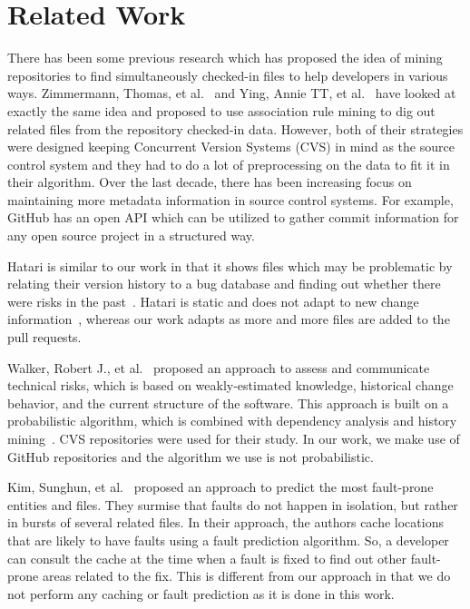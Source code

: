 
\section{Related Work}
\label{sec:related}

There has been some previous research which has proposed the idea of mining repositories to find simultaneously checked-in files to help developers in various ways. Zimmermann, Thomas, et al.~\cite{zimmermann2005mining} and Ying, Annie TT, et al.~\cite{ying2004predicting} have looked at exactly the same idea and proposed to use association rule mining to dig out related files from the repository checked-in data. However, both of their strategies were designed keeping Concurrent Version Systems (CVS) in mind as the source control system and they had to do a lot of preprocessing on the data to fit it in their algorithm. Over the last decade, there has been increasing focus on maintaining more metadata information in source control systems. For example, GitHub has an open API which can be utilized to gather commit information for any open source project in a structured way.

Hatari is similar to our work in that it shows files which may be problematic by relating their version history to a bug database and finding out whether there were risks in the past~\cite{sliwerski2005hatari}. Hatari is static and does not adapt to new change information~\cite{kim2007predicting}, whereas our work adapts as more and more files are added to the pull requests.

Walker, Robert J., et al.~\cite{walker2006lightweight} proposed an approach to assess and communicate technical risks, which is based on weakly-estimated knowledge, historical change behavior, and the current structure of the software. This approach is built on a probabilistic algorithm, which is combined with dependency analysis and history mining~\cite{lehnert2011review}. CVS repositories were used for their study. In our work, we make use of GitHub repositories and the algorithm we use is not probabilistic.

Kim, Sunghun, et al.~\cite{kim2007predicting} proposed an approach to predict the most fault-prone entities and files. They surmise that faults do not happen in isolation, but rather in bursts of several related files. In their approach, the authors cache locations that are likely to have faults using a fault prediction algorithm. So, a developer can consult the cache at the time when a fault is fixed to find out other fault-prone areas related to the fix. This is different from our approach in that we do not perform any caching or fault prediction as it is done in this work.

